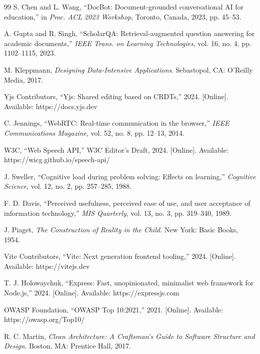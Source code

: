 \documentclass[12pt,a4paper]{report}
\begin{document}
\begin{thebibliography}{99}
S. Chen and L. Wang, ``DocBot: Document-grounded conversational AI for education,'' in \textit{Proc. ACL 2023 Workshop}, Toronto, Canada, 2023, pp. 45--53.

A. Gupta and R. Singh, ``ScholarQA: Retrieval-augmented question answering for academic documents,'' \textit{IEEE Trans. on Learning Technologies}, vol. 16, no. 4, pp. 1102--1115, 2023.

M. Kleppmann, \textit{Designing Data-Intensive Applications}. Sebastopol, CA: O'Reilly Media, 2017.

Yjs Contributors, ``Yjs: Shared editing based on CRDTs,'' 2024. [Online]. Available: https://docs.yjs.dev

C. Jennings, ``WebRTC: Real-time communication in the browser,'' \textit{IEEE Communications Magazine}, vol. 52, no. 8, pp. 12--13, 2014.

W3C, ``Web Speech API,'' W3C Editor's Draft, 2024. [Online]. Available: https://wicg.github.io/speech-api/

J. Sweller, ``Cognitive load during problem solving: Effects on learning,'' \textit{Cognitive Science}, vol. 12, no. 2, pp. 257--285, 1988.

F. D. Davis, ``Perceived usefulness, perceived ease of use, and user acceptance of information technology,'' \textit{MIS Quarterly}, vol. 13, no. 3, pp. 319--340, 1989.

J. Piaget, \textit{The Construction of Reality in the Child}. New York: Basic Books, 1954.

Vite Contributors, ``Vite: Next generation frontend tooling,'' 2024. [Online]. Available: https://vitejs.dev

T. J. Holowaychuk, ``Express: Fast, unopinionated, minimalist web framework for Node.js,'' 2024. [Online]. Available: https://expressjs.com

OWASP Foundation, ``OWASP Top 10:2021,'' 2021. [Online]. Available: https://owasp.org/Top10/

R. C. Martin, \textit{Clean Architecture: A Craftsman's Guide to Software Structure and Design}. Boston, MA: Prentice Hall, 2017.

\end{thebibliography}

\appendix
\end{document}
